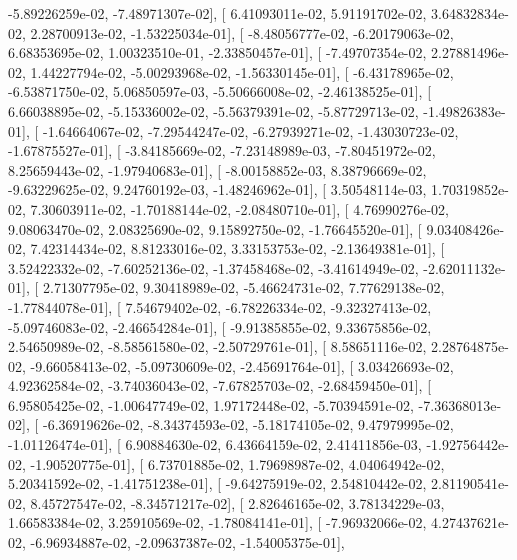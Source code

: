 \documentclass{article}
\begin{document}
         -5.89226259e-02,  -7.48971307e-02],
       [  6.41093011e-02,   5.91191702e-02,   3.64832834e-02,
          2.28700913e-02,  -1.53225034e-01],
       [ -8.48056777e-02,  -6.20179063e-02,   6.68353695e-02,
          1.00323510e-01,  -2.33850457e-01],
       [ -7.49707354e-02,   2.27881496e-02,   1.44227794e-02,
         -5.00293968e-02,  -1.56330145e-01],
       [ -6.43178965e-02,  -6.53871750e-02,   5.06850597e-03,
         -5.50666008e-02,  -2.46138525e-01],
       [  6.66038895e-02,  -5.15336002e-02,  -5.56379391e-02,
         -5.87729713e-02,  -1.49826383e-01],
       [ -1.64664067e-02,  -7.29544247e-02,  -6.27939271e-02,
         -1.43030723e-02,  -1.67875527e-01],
       [ -3.84185669e-02,  -7.23148989e-03,  -7.80451972e-02,
          8.25659443e-02,  -1.97940683e-01],
       [ -8.00158852e-03,   8.38796669e-02,  -9.63229625e-02,
          9.24760192e-03,  -1.48246962e-01],
       [  3.50548114e-03,   1.70319852e-02,   7.30603911e-02,
         -1.70188144e-02,  -2.08480710e-01],
       [  4.76990276e-02,   9.08063470e-02,   2.08325690e-02,
          9.15892750e-02,  -1.76645520e-01],
       [  9.03408426e-02,   7.42314434e-02,   8.81233016e-02,
          3.33153753e-02,  -2.13649381e-01],
       [  3.52422332e-02,  -7.60252136e-02,  -1.37458468e-02,
         -3.41614949e-02,  -2.62011132e-01],
       [  2.71307795e-02,   9.30418989e-02,  -5.46624731e-02,
          7.77629138e-02,  -1.77844078e-01],
       [  7.54679402e-02,  -6.78226334e-02,  -9.32327413e-02,
         -5.09746083e-02,  -2.46654284e-01],
       [ -9.91385855e-02,   9.33675856e-02,   2.54650989e-02,
         -8.58561580e-02,  -2.50729761e-01],
       [  8.58651116e-02,   2.28764875e-02,  -9.66058413e-02,
         -5.09730609e-02,  -2.45691764e-01],
       [  3.03426693e-02,   4.92362584e-02,  -3.74036043e-02,
         -7.67825703e-02,  -2.68459450e-01],
       [  6.95805425e-02,  -1.00647749e-02,   1.97172448e-02,
         -5.70394591e-02,  -7.36368013e-02],
       [ -6.36919626e-02,  -8.34374593e-02,  -5.18174105e-02,
          9.47979995e-02,  -1.01126474e-01],
       [  6.90884630e-02,   6.43664159e-02,   2.41411856e-03,
         -1.92756442e-02,  -1.90520775e-01],
       [  6.73701885e-02,   1.79698987e-02,   4.04064942e-02,
          5.20341592e-02,  -1.41751238e-01],
       [ -9.64275919e-02,   2.54810442e-02,   2.81190541e-02,
          8.45727547e-02,  -8.34571217e-02],
       [  2.82646165e-02,   3.78134229e-03,   1.66583384e-02,
          3.25910569e-02,  -1.78084141e-01],
       [ -7.96932066e-02,   4.27437621e-02,  -6.96934887e-02,
         -2.09637387e-02,  -1.54005375e-01],
\end{document}
